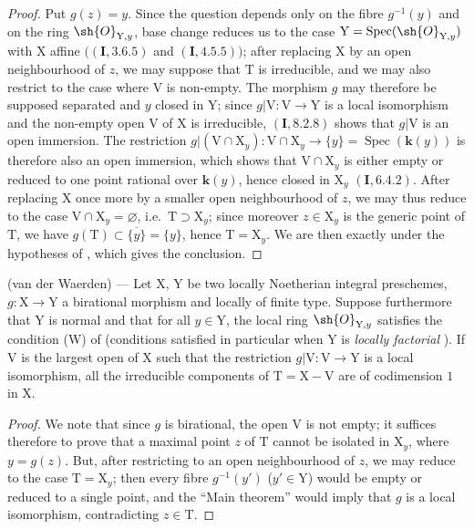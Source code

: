 \begin{proof}
Put $g(z)=y$. Since the question depends only on the fibre $g^{-1}(y)$ and on the ring $\sh{O}_{\mathrm{Y},y}$, base change reduces us to the case $\mathrm{Y}=\operatorname{Spec}(\sh{O}_{\mathrm{Y},y})$ with $\mathrm{X}$ affine $((\mathbf I,3.6.5)$ and $(\mathbf I,4.5.5))$; after replacing $\mathrm{X}$ by an open neighbourhood of $z$, we may suppose that $\mathrm{T}$ is irreducible, and we may also restrict to the case where $\mathrm{V}$ is non-empty.
The morphism $g$ may therefore be supposed separated and $y$ closed in $\mathrm{Y}$; since $g|\mathrm{V}:\mathrm{V}\to\mathrm{Y}$ is a local isomorphism and the non-empty open $\mathrm{V}$ of $\mathrm{X}$ is irreducible, $(\mathbf I,8.2.8)$ shows that $g|\mathrm{V}$ is an open immersion.
The restriction $g|(\mathrm{V}\cap\mathrm{X}_y):\mathrm{V}\cap\mathrm{X}_y\to\{y\}=\operatorname{Spec}(\boldsymbol{k}(y))$ is therefore also an open immersion, which shows that $\mathrm{V}\cap\mathrm{X}_y$ is either empty or reduced to one point rational
over $\boldsymbol{k}(y)$, hence closed in $\mathrm{X}_y$ $(\mathbf I,6.4.2)$.
After replacing $\mathrm{X}$ once more by a smaller open neighbourhood of $z$, we may thus reduce to the case $\mathrm{V}\cap\mathrm{X}_y=\varnothing$, i.e.\ $\mathrm{T}\supset\mathrm{X}_y$; since moreover $z\in\mathrm{X}_y$ is the generic point of $\mathrm{T}$, we have $g(\mathrm{T})\subset\overline{\{y\}}=\{y\}$, hence $\mathrm{T}=\mathrm{X}_y$. We are then exactly under the hypotheses of , which gives the conclusion.
\end{proof}

\begin{theorem}[21.12.12]
\label{IV.21.12.12}
\textup{(van der Waerden)} ---
Let $\mathrm{X}$, $\mathrm{Y}$ be two locally Noetherian integral preschemes, $g:\mathrm{X}\to\mathrm{Y}$ a birational morphism and locally of finite type.
Suppose furthermore that $\mathrm{Y}$ is normal and that for all $y\in\mathrm{Y}$, the local ring $\sh{O}_{\mathrm{Y},y}$ satisfies the condition \textup{(W)} of  (conditions satisfied in particular when $\mathrm{Y}$ is \emph{locally factorial} ).
If $\mathrm{V}$ is the largest open of $\mathrm{X}$ such that the restriction $g|\mathrm{V}:\mathrm{V}\to\mathrm{Y}$ is a local isomorphism, all the irreducible components of $\mathrm{T}=\mathrm{X}-\mathrm{V}$ are of codimension $1$ in $\mathrm{X}$.
\end{theorem}

\begin{proof}
We note that since $g$ is birational, the open $\mathrm{V}$ is not empty; it suffices therefore to prove that a maximal point $z$ of $\mathrm{T}$ cannot be isolated in $\mathrm{X}_y$, where $y=g(z)$.
But, after restricting to an open neighbourhood of $z$, we may reduce to the case $\mathrm{T}=\mathrm{X}_y$; then every fibre $g^{-1}(y')$ ($y'\in\mathrm{Y}$) would be empty or reduced to a single point, and the ``Main theorem''  would imply that $g$ is a local isomorphism, contradicting $z\in\mathrm{T}$.
\end{proof}

